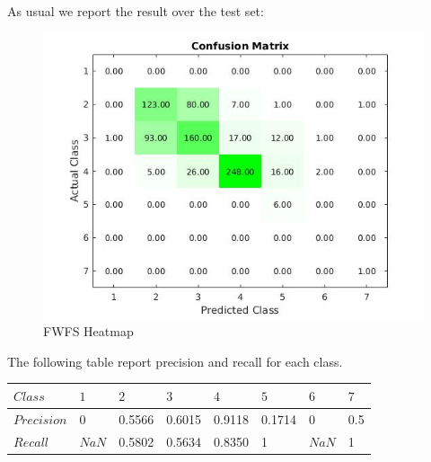 \documentclass[a4paper,10pt]{article}
\begin{document}
      As usual we report the result over the test set:
      \begin{figure}[H]
	\centering
	\includegraphics[scale=0.5]{fwfs-heat.jpg}
	\caption{FWFS Heatmap}
      \end{figure}
      The following table report precision and recall for each class.
      \begin{table}[H]
      	\centering
	\begin{tabular}{l|P{1cm}P{1cm}P{1cm}P{1cm}P{1cm}P{1cm}P{1cm}} \toprule
	  {$Class$} & {$1$} & {$2$} & {$3$} & {$4$} & {$5$} & {$6$} & {$7$} \\ \midrule
	  $Precision$  & 0 & 0.5566 & 0.6015 & 0.9118 & 0.1714 & 0 & 0.5 \\ \midrule
	  $Recall$  & $NaN$ & 0.5802 & 0.5634 & 0.8350 & 1 & $NaN$ & 1 \\ \bottomrule
	\end{tabular}
      \end{table}
     
\end{document}
